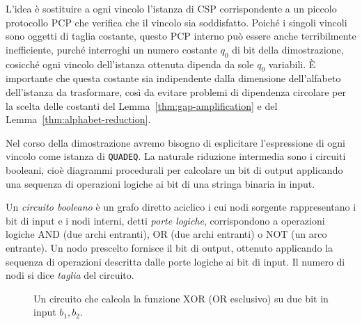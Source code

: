 L'idea è sostituire a ogni vincolo l'istanza di CSP corrispondente a un piccolo
protocollo PCP che verifica che il vincolo sia soddisfatto. Poiché i singoli
vincoli sono oggetti di taglia costante, questo PCP interno può essere anche
terribilmente inefficiente, purché interroghi un numero costante $q_0$ di bit
della dimostrazione, cosicché ogni vincolo dell'istanza ottenuta dipenda da
sole $q_0$ variabili.
È importante che questa costante sia indipendente dalla dimensione
dell'alfabeto dell'istanza da trasformare, così da evitare problemi di
dipendenza circolare per la scelta delle costanti del
Lemma~\ref{thm:gap-amplification} e del Lemma~\ref{thm:alphabet-reduction}.

Nel corso della dimostrazione avremo bisogno di esplicitare l'espressione di
ogni vincolo come istanza di \texttt{QUADEQ}. La naturale riduzione intermedia
sono i circuiti booleani, cioè diagrammi procedurali per calcolare un bit di
output applicando una sequenza di operazioni logiche ai bit di una stringa
binaria in input.

\begin{definition}
	Un \emph{circuito booleano} è un grafo diretto aciclico i cui nodi
	sorgente rappresentano i bit di input e i nodi interni, detti
	\emph{porte logiche}, corrispondono a operazioni logiche
	$\mathrm{AND}$ (due archi entranti), $\mathrm{OR}$ (due archi entranti) o
	$\mathrm{NOT}$ (un arco entrante).
	Un nodo prescelto fornisce il bit di output, ottenuto applicando la
	sequenza di operazioni descritta dalle porte logiche ai bit di input.
	Il numero di nodi si dice \emph{taglia} del circuito.
\end{definition}

\begin{figure}[htbp]
	\centering
	\begin{minipage}[c]{0.52\textwidth}
		\caption{Un circuito che calcola la funzione $\mathrm{XOR}$
			($\mathrm{OR}$ esclusivo) su due bit in input $b_1, b_2$.}
		\label{fig:xor-circuit}
	\end{minipage}
	\hfill
	\begin{minipage}[c]{0.42\textwidth}
		\centering
		
	\end{minipage}
\end{figure}


